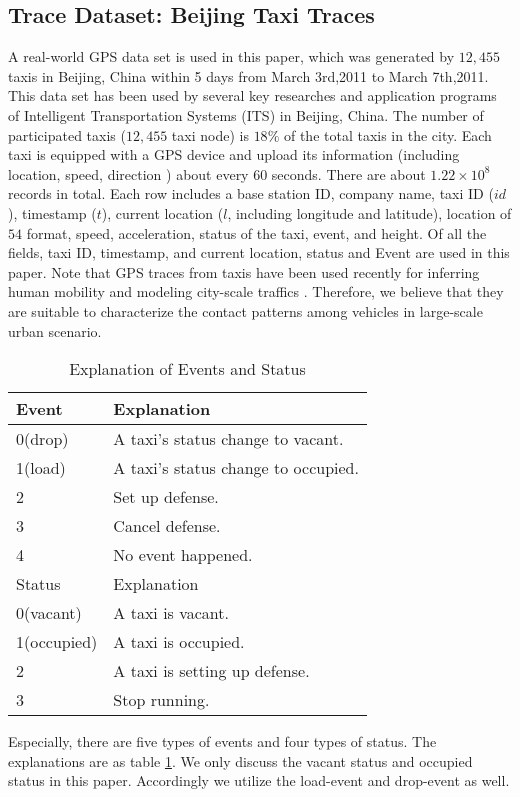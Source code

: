\subsection{Trace Dataset: Beijing Taxi Traces}
\label{section_trace_data}

A real-world GPS data set is used in this paper, which was generated by $12,455$ taxis in Beijing, China within 5 days from March 3rd,2011 to March 7th,2011. This data set has been used by several key researches and application programs of Intelligent Transportation Systems (ITS) in Beijing, China. The number of participated taxis ($12,455$ taxi node) is $18\%$ of the total taxis in the city. Each taxi is equipped with a GPS device and upload its information (including location, speed, direction ) about every 60 seconds. There are about $1.22 \times 10^8$ records in total.
Each row includes a base station ID, company name, taxi ID ($id$), timestamp ($t$), current location ($l$, including longitude and latitude), location of $54$ format, speed, acceleration, status of the taxi, event, and height. Of all the fields, taxi ID, timestamp, and current location, status and Event are used in this paper.  Note that GPS traces from taxis have been used recently for inferring human mobility \cite{Ganti} and modeling city-scale traffics \cite{Aslam}. Therefore, we believe that they are suitable to characterize the contact patterns among vehicles in large-scale urban scenario.

\begin{table}[!t]
\caption{Explanation of Events and Status}\label{table_event_detail}
\centering
\begin{tabular}{l|l}
  \hline
  Event & Explanation \\
  \hline
  0(drop) & A taxi's status change to vacant.\\
  \hline
  1(load) & A taxi's status change to occupied.\\
  \hline
  2 & Set up defense.\\
  \hline
  3 & Cancel defense.\\
  \hline
  4 & No event happened.\\
  \hline
  \hline
  Status & Explanation \\
  \hline
0(vacant) & A taxi is vacant. \\
    \hline
1(occupied) & A taxi is occupied. \\
    \hline
2 & A taxi is setting up defense. \\
    \hline
3 & Stop running.\\
  \hline
\end{tabular}
\end{table}


Especially, there are five types of events and four types of status. The explanations are as table \ref{table_event_detail}. We only discuss the vacant status and occupied status in this paper. Accordingly we utilize the load-event and drop-event as well.






